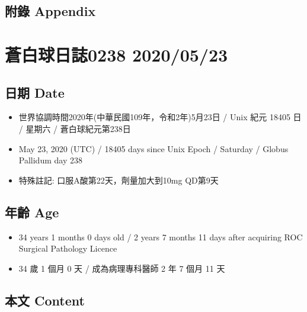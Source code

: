 \documentclass[a5paper, 11pt
]{book}
\providecommand{\tightlist}{%
  \setlength{\itemsep}{0pt}\setlength{\parskip}{0pt}}
\begin{document}
\hypertarget{ux9644ux9304-appendix-82}{%
\subsection{附錄 Appendix}\label{ux9644ux9304-appendix-82}}

\hypertarget{ux84bcux767dux7403ux65e5ux8a8c0238-20200523}{%
\section{蒼白球日誌0238
2020/05/23}\label{ux84bcux767dux7403ux65e5ux8a8c0238-20200523}}

\hypertarget{ux65e5ux671f-date-83}{%
\subsection{日期 Date}\label{ux65e5ux671f-date-83}}

\begin{itemize}
\tightlist
\item
  世界協調時間2020年(中華民國109年，令和2年)5月23日 / Unix 紀元 18405 日
  / 星期六 / 蒼白球紀元第238日
\item
  May 23, 2020 (UTC) / 18405 days since Unix Epoch / Saturday / Globus
  Pallidum day 238
\item
  特殊註記: 口服A酸第22天，劑量加大到10mg QD第9天
\end{itemize}

\hypertarget{ux5e74ux9f61-age-83}{%
\subsection{年齡 Age}\label{ux5e74ux9f61-age-83}}

\begin{itemize}
\tightlist
\item
  34 years 1 months 0 days old / 2 years 7 months 11 days after
  acquiring ROC Surgical Pathology Licence
\item
  34 歲 1 個月 0 天 / 成為病理專科醫師 2 年 7 個月 11 天
\end{itemize}

\hypertarget{ux672cux6587-content-83}{%
\subsection{本文 Content}\label{ux672cux6587-content-83}}
\end{document}
